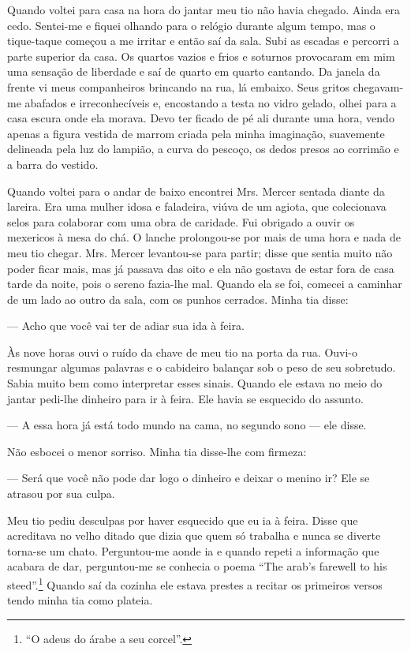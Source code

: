 Quando voltei para casa na hora do jantar meu tio não havia chegado.
Ainda era cedo. Sentei-me e fiquei olhando para o relógio durante
algum tempo, mas o tique-taque começou a me irritar e então saí da
sala. Subi as escadas e percorri a parte superior da casa. Os quartos
vazios e frios e soturnos provocaram em mim uma sensação de liberdade
e saí de quarto em quarto cantando. Da janela da frente vi meus
companheiros brincando na rua, lá embaixo. Seus gritos chegavam-me
abafados e irreconhecíveis e, encostando a testa no vidro gelado,
olhei para a casa escura onde ela morava. Devo ter ficado de pé ali
durante uma hora, vendo apenas a figura vestida de marrom criada pela
minha imaginação, suavemente delineada pela luz do lampião, a curva do
pescoço, os dedos presos ao corrimão e a barra do vestido.

Quando voltei para o andar de baixo encontrei Mrs. Mercer sentada
diante da lareira. Era uma mulher idosa e faladeira, viúva de um
agiota, que colecionava selos para colaborar com uma obra de caridade.
Fui obrigado a ouvir os mexericos à mesa do chá. O lanche prolongou-se
por mais de uma hora e nada de meu tio chegar. Mrs. Mercer levantou-se
para partir; disse que sentia muito não poder ficar mais, mas já
passava das oito e ela não gostava de estar fora de casa tarde da
noite, pois o sereno fazia-lhe mal. Quando ela se foi, comecei a
caminhar de um lado ao outro da sala, com os punhos cerrados. Minha
tia disse:

--- Acho que você vai ter de adiar sua ida à feira.

Às nove horas ouvi o ruído da chave de meu tio na porta da rua. Ouvi-o
resmungar algumas palavras e o cabideiro balançar sob o peso de seu
sobretudo. Sabia muito bem como interpretar esses sinais. Quando ele
estava no meio do jantar pedi-lhe dinheiro para ir à feira. Ele
havia se esquecido do assunto.

--- A essa hora já está todo mundo na cama, no segundo sono
--- ele disse.

Não esbocei o menor sorriso. Minha tia disse-lhe com firmeza:

--- Será que você não pode dar logo o dinheiro e deixar o menino ir?
Ele se atrasou por sua culpa.

Meu tio pediu desculpas por haver esquecido que eu ia à feira. Disse
que acreditava no velho ditado que dizia que quem só trabalha e nunca
se diverte torna-se um chato. Perguntou-me aonde ia e quando repeti a
informação que acabara de dar, perguntou-me se conhecia o poema
``The arab's farewell to his steed''.\footnote{ ``O adeus do árabe a
seu corcel''.} Quando saí da cozinha ele
estava prestes a recitar os primeiros versos tendo minha tia como
plateia.

